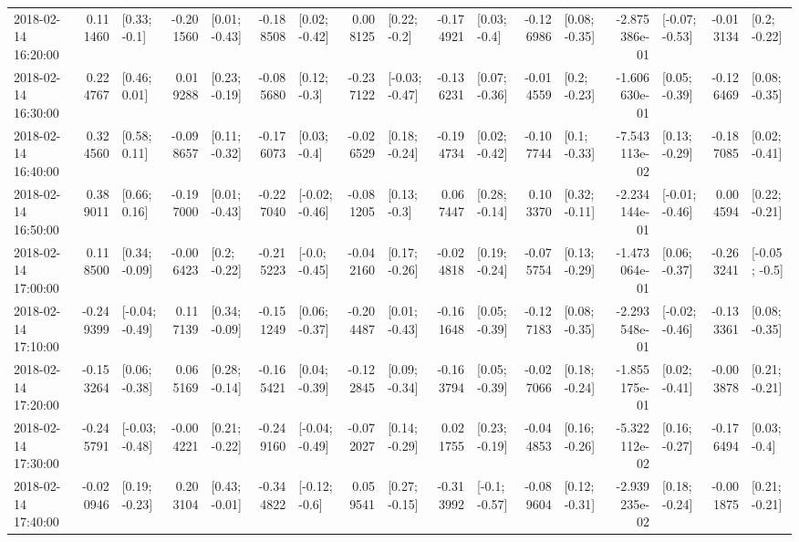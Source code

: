 \begin{tabular}{lrlrlrlrlrlrlrlrl}
2018-02-14 16:20:00 &  0.111460 &    [0.33; -0.1] & -0.201560 &   [0.01; -0.43] & -0.188508 &   [0.02; -0.42] &  0.008125 &    [0.22; -0.2] & -0.174921 &    [0.03; -0.4] & -0.126986 &   [0.08; -0.35] & -2.875386e-01 &  [-0.07; -0.53] & -0.013134 &    [0.2; -0.22] \\
2018-02-14 16:30:00 &  0.224767 &    [0.46; 0.01] &  0.019288 &   [0.23; -0.19] & -0.085680 &    [0.12; -0.3] & -0.237122 &  [-0.03; -0.47] & -0.136231 &   [0.07; -0.36] & -0.014559 &    [0.2; -0.23] & -1.606630e-01 &   [0.05; -0.39] & -0.126469 &   [0.08; -0.35] \\
2018-02-14 16:40:00 &  0.324560 &    [0.58; 0.11] & -0.098657 &   [0.11; -0.32] & -0.176073 &    [0.03; -0.4] & -0.026529 &   [0.18; -0.24] & -0.194734 &   [0.02; -0.42] & -0.107744 &    [0.1; -0.33] & -7.543113e-02 &   [0.13; -0.29] & -0.187085 &   [0.02; -0.41] \\
2018-02-14 16:50:00 &  0.389011 &    [0.66; 0.16] & -0.197000 &   [0.01; -0.43] & -0.227040 &  [-0.02; -0.46] & -0.081205 &    [0.13; -0.3] &  0.067447 &   [0.28; -0.14] &  0.103370 &   [0.32; -0.11] & -2.234144e-01 &  [-0.01; -0.46] &  0.004594 &   [0.22; -0.21] \\
2018-02-14 17:00:00 &  0.118500 &   [0.34; -0.09] & -0.006423 &    [0.2; -0.22] & -0.215223 &   [-0.0; -0.45] & -0.042160 &   [0.17; -0.26] & -0.024818 &   [0.19; -0.24] & -0.075754 &   [0.13; -0.29] & -1.473064e-01 &   [0.06; -0.37] & -0.263241 &   [-0.05; -0.5] \\
2018-02-14 17:10:00 & -0.249399 &  [-0.04; -0.49] &  0.117139 &   [0.34; -0.09] & -0.151249 &   [0.06; -0.37] & -0.204487 &   [0.01; -0.43] & -0.161648 &   [0.05; -0.39] & -0.127183 &   [0.08; -0.35] & -2.293548e-01 &  [-0.02; -0.46] & -0.133361 &   [0.08; -0.35] \\
2018-02-14 17:20:00 & -0.153264 &   [0.06; -0.38] &  0.065169 &   [0.28; -0.14] & -0.165421 &   [0.04; -0.39] & -0.122845 &   [0.09; -0.34] & -0.163794 &   [0.05; -0.39] & -0.027066 &   [0.18; -0.24] & -1.855175e-01 &   [0.02; -0.41] & -0.003878 &   [0.21; -0.21] \\
2018-02-14 17:30:00 & -0.245791 &  [-0.03; -0.48] & -0.004221 &   [0.21; -0.22] & -0.249160 &  [-0.04; -0.49] & -0.072027 &   [0.14; -0.29] &  0.021755 &   [0.23; -0.19] & -0.044853 &   [0.16; -0.26] & -5.322112e-02 &   [0.16; -0.27] & -0.176494 &    [0.03; -0.4] \\
2018-02-14 17:40:00 & -0.020946 &   [0.19; -0.23] &  0.203104 &   [0.43; -0.01] & -0.344822 &   [-0.12; -0.6] &  0.059541 &   [0.27; -0.15] & -0.313992 &   [-0.1; -0.57] & -0.089604 &   [0.12; -0.31] & -2.939235e-02 &   [0.18; -0.24] & -0.001875 &   [0.21; -0.21] \\

\end{tabular}
